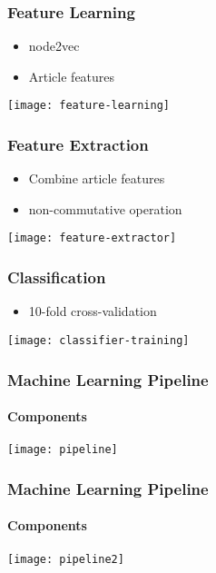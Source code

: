 \begin{frame}
    \frametitle{Feature Learning}
    \centering

    \begin{itemize}
      \item node2vec
      \item Article features
    \end{itemize}

    \texttt{[image: feature-learning]}
\end{frame}


\begin{frame}
    \frametitle{Feature Extraction}
    \centering

    \begin{itemize}
      \item Combine article features
      \item non-commutative operation
    \end{itemize}

   \texttt{[image: feature-extractor]}
\end{frame}


\begin{frame}
    \frametitle{Classification}
    \centering

    \begin{itemize}
      \item 10-fold cross-validation
    \end{itemize}

    \texttt{[image: classifier-training]}
\end{frame}


\begin{frame}
    \frametitle{Machine Learning Pipeline}
    \framesubtitle{Components}
    \centering

    \texttt{[image: pipeline]}
\end{frame}


\begin{frame}
    \frametitle{Machine Learning Pipeline}
    \framesubtitle{Components}
    \centering

    \texttt{[image: pipeline2]}
\end{frame}
